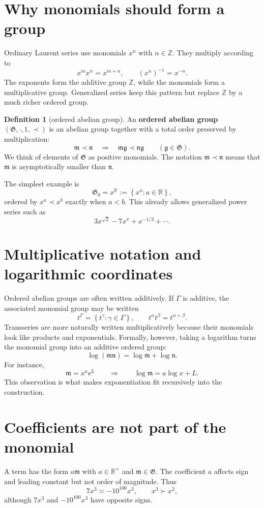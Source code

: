 \documentclass[11pt,openany]{book}
\theoremstyle{plain}
\theoremstyle{definition}
\newtheorem{definition}[theorem]{Definition}
\theoremstyle{remark}
\newcommand{\R}{\mathbb{R}}
\newcommand{\Z}{\mathbb{Z}}
\newcommand{\G}{\mathfrak{G}}
\newcommand{\m}{\mathfrak{m}}
\newcommand{\n}{\mathfrak{n}}
\newcommand{\g}{\mathfrak{g}}
\newcommand{\e}{\mathrm{e}}
\newcommand{\set}[1]{\left\{#1\right\}}
\newcommand{\defterm}[1]{\textbf{#1}}
\begin{document}
\section{Why monomials should form a group}
Ordinary Laurent series use monomials $x^n$ with $n\in\Z$. They multiply according to
\[
  x^m x^n=x^{m+n},
  \qquad
  (x^n)^{-1}=x^{-n}.
\]
The exponents form the additive group $\Z$, while the monomials form a multiplicative group. Generalized series keep this pattern but replace $\Z$ by a much richer ordered group.

\begin{definition}[ordered abelian group]
An \defterm{ordered abelian group} $(\G,\cdot,1,\prec)$ is an abelian group together with a total order preserved by multiplication:
\[
  \m\prec\n\quad\Longrightarrow\quad \m\g\prec\n\g
  \qquad(\g\in\G).
\]
We think of elements of $\G$ as positive monomials. The notation $\m\prec\n$ means that $\m$ is asymptotically smaller than $\n$.
\end{definition}

The simplest example is
\[
  \G_0=x^\R:=\set{x^a:a\in\R},
\]
ordered by $x^a\prec x^b$ exactly when $a<b$. This already allows generalized power series such as
\[
  3x^{\sqrt2}-7x^\pi+x^{-1/3}+\cdots.
\]

\section{Multiplicative notation and logarithmic coordinates}
Ordered abelian groups are often written additively. If $\Gamma$ is additive, the associated monomial group may be written
\[
  t^\Gamma=\set{t^\gamma:\gamma\in\Gamma},
  \qquad t^\alpha t^\beta=t^{\alpha+\beta}.
\]
Transseries are more naturally written multiplicatively because their monomials look like products and exponentials. Formally, however, taking a logarithm turns the monomial group into an additive ordered group:
\[
  \log(\m\n)=\log\m+\log\n.
\]
For instance,
\[
  \m=x^a\e^L
  \qquad\Longrightarrow\qquad
  \log\m=a\log x+L.
\]
This observation is what makes exponentiation fit recursively into the construction.

\section{Coefficients are not part of the monomial}
A term has the form $a\m$ with $a\in\R^\times$ and $\m\in\G$. The coefficient $a$ affects sign and leading constant but not order of magnitude. Thus
\[
  7x^3\asymp -10^{100}x^3,
  \qquad
  x^3\succ x^2,
\]
although $7x^3$ and $-10^{100}x^3$ have opposite signs.
\end{document}

